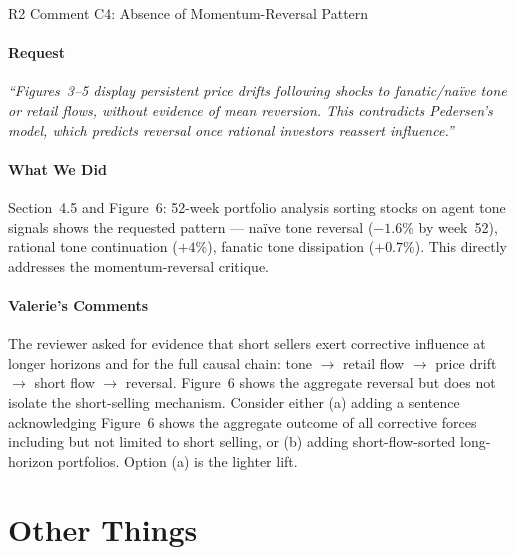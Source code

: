 \documentclass[11pt]{article}
\makeatletter
\def\section{\@ifstar\section@star\section@nostar}
\def\section@star#1{%
  \par\vspace{1.5ex}%
  \noindent{\normalsize\bfseries#1}\par%
  \vspace{0.5ex}%
  \@afterheading%
}
\def\section@nostar#1{%
  \par\vspace{1.5ex}%
  \noindent{%
    \setlength{\fboxsep}{4pt}%
    \colorbox{sectionbg}{\parbox{\dimexpr\textwidth-8pt\relax}{\normalsize\bfseries\strut#1\strut}}%
  }\par%
  \vspace{0.5ex}%
  \@afterheading%
}
\newcommand{\concern}[1]{#1}
\makeatother
\begin{document}
\section{R2 Comment C4: Absence of Momentum-Reversal Pattern}

\subsection*{Request}
\begin{mdframed}
\textit{``Figures~3--5 display persistent price drifts following shocks to
fanatic/na\"{i}ve tone or retail flows, without evidence of mean reversion.
This contradicts Pedersen's model, which predicts reversal once rational
investors reassert influence.''}
\end{mdframed}

\subsection*{What We Did}
Section~4.5 and Figure~6: 52-week portfolio analysis sorting stocks on agent
tone signals shows the requested pattern --- na\"{i}ve tone reversal
($-1.6\%$ by week~52), rational tone continuation ($+4\%$), fanatic tone
dissipation ($+0.7\%$). This directly addresses the momentum-reversal
critique.

\subsection*{Valerie's Comments}
\concern{The reviewer asked for evidence that short sellers exert corrective
influence at longer horizons and for the full causal chain: tone $\to$ retail
flow $\to$ price drift $\to$ short flow $\to$ reversal. Figure~6 shows the
aggregate reversal but does not isolate the short-selling mechanism. Consider
either (a) adding a sentence acknowledging Figure~6 shows the aggregate
outcome of all corrective forces including but not limited to short selling,
or (b) adding short-flow-sorted long-horizon portfolios. Option (a) is the
lighter lift.}

\newpage
\part{Other Things}
\end{document}
